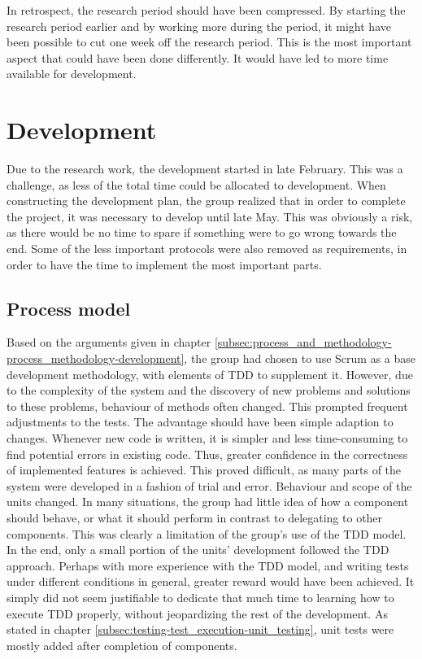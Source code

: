 In retrospect, the research period should have been compressed. By starting the research period earlier and by working more during the period, it might have been possible to cut one week off the research period. This is the most important aspect that could have been done differently. It would have led to more time available for development.

\section{Development}
\label{sec:project_evaluation-development}

Due to the research work, the development started in late February. This was a challenge, as less of the total time could be allocated to development. When constructing the development plan, the group realized that in order to complete the project, it was necessary to develop until late May. This was obviously a risk, as there would be no time to spare if something were to go wrong towards the end. Some of the less important protocols were also removed as requirements, in order to have the time to implement the most important parts.

\subsection{Process model}
\label{subsec:project_evaluation-development-process_model}

Based on the arguments given in chapter \ref{subsec:process_and_methodology-process_methodology-development}, the group had chosen to use Scrum as a base development methodology, with elements of TDD to supplement it. However, due to the complexity of the system and the discovery of new problems and solutions to these problems, behaviour of methods often changed. This prompted frequent adjustments to the tests. The advantage should have been simple adaption to changes. Whenever new code is written, it is simpler and less time-consuming to find potential errors in existing code. Thus, greater confidence in the correctness of implemented features is achieved. This proved difficult, as many parts of the system were developed in a fashion of trial and error. Behaviour and scope of the units changed. In many situations, the group had little idea of how a component should behave, or what it should perform in contrast to delegating to other components. This was clearly a limitation of the group's use of the TDD model. In the end, only a small portion of the units' development followed the TDD approach. Perhaps with more experience with the TDD model, and writing tests under different conditions in general, greater reward would have been achieved. It simply did not seem justifiable to dedicate that much time to learning how to execute TDD properly, without jeopardizing the rest of the development. As stated in chapter \ref{subsec:testing-test_execution-unit_testing}, unit tests were mostly added after completion of components.

